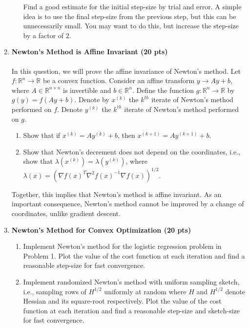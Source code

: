 \begin{enumerate}
\begin{enumerate}
     Find a good estimate for the initial step-size by trial and error. A simple idea is to use the final step-size from the previous step, but this can be unnecessarily small. You may want to do this, but increase the step-size by a factor of 2.

 \end{enumerate}
 \solution{
 }
\newpage
 
 \item \textbf{Newton's Method is Affine Invariant (20 pts)}\\\\
 In this question, we will prove the affine invariance of Newton's method. Let $f: \mathbb{R}^n \rightarrow \mathbb{R}$ be a convex function. Consider an affine transform $y \rightarrow Ay+b$, where $A \in \mathbb{R}^{n \times n}$ is invertible and $b \in \mathbb{R}^n$. Define the function $g: \mathbb{R}^n \rightarrow \mathbb{R}$ by $g(y)=f(Ay+b)$. Denote by $x^{(k)}$ the $k^{th}$ iterate of Newton's method performed on $f$. Denote $y^{(k)}$ the $k^{th}$ iterate of Newton's method performed on $g$.
\begin{enumerate}
    \item Show that if $x^{(k)}=A y^{(k)}+b$, then $x^{(k+1)}=A y^{(k+1)}+b$.
    \item Show that Newton's decrement does not depend on the coordinates, i.e., show that $\lambda(x^{(k)})=\lambda(y^{(k)})$, where $\lambda(x)=(\nabla f(x)^T \nabla^2f(x)^{-1} \nabla f(x))^{1/2}$.
\end{enumerate}
Together, this implies that Newton's method is affine invariant. As an important consequence, Newton's method cannot be improved by a change of coordinates, unlike gradient descent.
\solution{
}

\item \textbf{Newton's Method for Convex Optimization (20 pts)}
\begin{enumerate}
    \item Implement Newton's method for the logistic regression problem in Problem 1. Plot the value of the cost function at each iteration and find a reasonable step-size for fast convergence.
    \item Implement randomized Newton's method with uniform sampling sketch, i.e., sampling rows of $H^{1/2}$ uniformly at random where $H$ and $H^{1/2}$ denote Hessian and its square-root respectively. Plot the value of the cost function at each iteration and find a reasonable step-size and sketch-size for fast convergence.
\end{enumerate}
\solution{
 }



\end{enumerate}
